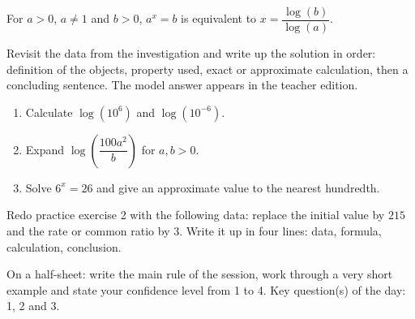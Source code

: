 \begin{traceecrite}For $a>0$, $a\neq1$ and $b>0$, $a^x=b$ is equivalent to $x=\dfrac{\log(b)}{\log(a)}$.\end{traceecrite}

\begin{exemple}
Revisit the data from the investigation and write up the solution in order: definition of the objects, property used, exact or approximate calculation, then a concluding sentence. The model answer appears in the teacher edition.
\end{exemple}

\begin{exercice}[-- essentiel]
\begin{enumerate}\item Calculate $\log(10^6)$ and $\log(10^{-6})$.\item Expand $\log\!\left(\dfrac{100a^2}{b}\right)$ for $a,b>0$.\item Solve $6^x=26$ and give an approximate value to the nearest hundredth.\end{enumerate}
\end{exercice}


\begin{dm}Redo practice exercise 2 with the following data: replace the initial value by $215$ and the rate or common ratio by $3$. Write it up in four lines: data, formula, calculation, conclusion.\end{dm}

\begin{sortie}On a half-sheet: write the main rule of the session, work through a very short example and state your confidence level from 1 to 4. Key question(s) of the day: 1, 2 and 3.\end{sortie}

